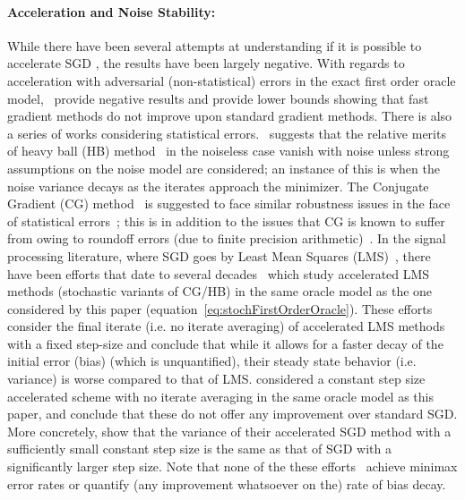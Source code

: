 \paragraph{Acceleration and Noise Stability:}  
While there have been several attempts at understanding if it is
possible to accelerate SGD , the results have been largely negative.
With regards to acceleration with adversarial (non-statistical) errors in the exact first order oracle model,~\cite{dAspremont08} provide negative results and \citet{DevolderGN13,DevolderGN14} provide
lower bounds showing that fast gradient methods do not improve upon
standard gradient methods. There is also a series of works considering
statistical errors.~\cite{Polyak87} suggests that the relative
merits of heavy ball (HB) method~\citep{Polyak64} in the noiseless case
vanish with noise unless strong assumptions on the
noise model are considered; an instance of this is when the
noise variance decays as the iterates approach the minimizer. The
Conjugate Gradient (CG) method~\citep{HestenesS52} is suggested to face
similar robustness issues in the face of statistical
errors~\citep{Polyak87}; this is in addition to the issues that CG is
known to suffer from owing to roundoff errors (due to finite precision
arithmetic)~\citep{Paige71,Greenbaum89}. In the signal processing
literature, where SGD goes by Least Mean Squares
(LMS)~\citep{WidrowS85}, there have been efforts that date to several
decades~\citep{Proakis74,RoyS90,SharmaSB98} which study accelerated LMS
methods (stochastic variants of CG/HB) in the
same oracle model as the one considered by this paper
(equation~\ref{eq:stochFirstOrderOracle}). These efforts consider the
final iterate (i.e. no iterate averaging) of accelerated LMS
methods with a fixed step-size and conclude that while it allows for a
faster decay of the initial error (bias) (which is unquantified), their steady state behavior (i.e. variance) is worse
compared to that of LMS. \citet{YuanYS16} considered a
constant step size accelerated scheme with no iterate averaging in the same oracle model as this paper, and conclude that these do not offer any improvement over standard SGD. More concretely, \citet{YuanYS16} show that the
variance of their accelerated SGD method with a sufficiently small constant step size is the same as that of SGD with a significantly larger step size. Note that none of the these efforts~\citep{Proakis74,RoyS90,SharmaSB98,YuanYS16} achieve minimax
error rates or quantify (any improvement whatsoever on the) rate of bias decay.


